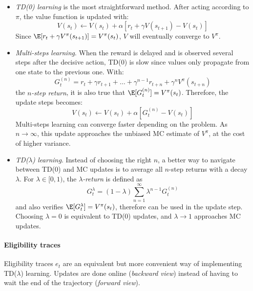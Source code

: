 \begin{itemize}
    \item \emph{TD(0) learning} is the most straightforward method. After acting according to $\pi$, the value function is updated with: 
    \[
        V(s_t) \leftarrow V(s_t) + \alpha [r_t + \gamma V(s_{t+1}) - V(s_t)]
    \]
    Since $\E[r_t + \gamma V^\pi(s_{t+1})] = V^\pi(s_t)$, $V$ will eventually converge to $V^\pi$. 
    
    \item \emph{Multi-steps learning}. When the reward is delayed and is observed several steps after the decisive action, TD(0) is slow since values only propagate from one state to the previous one. With:
    \[
        G_t^{(n)} = r_t + \gamma r_{t+1} + \dots + \gamma^{n-1} r_{t+n} + \gamma^n V^\pi(s_{t+n})
    \]
    the \emph{$n$-step return}, it is also true that $\E[G_t^{(n)}] = V^\pi(s_t)$. Therefore, the update steps becomes: 
    \[
        V(s_t) \leftarrow V(s_t) + \alpha [G_t^{(n)} - V(s_t)]
    \]
    Multi-steps learning can converge faster depending on the problem. As $n \rightarrow \infty$, this update approaches the unbiased MC estimate of $V^\pi$, at the cost of higher variance.

    \item \emph{TD($\lambda$) learning}. Instead of choosing the right $n$, a better way to navigate between TD(0) and MC updates is to average all $n$-step returns with a decay $\lambda$. For $\lambda \in [0,1)$, the \emph{$\lambda$-return} is defined as
    \[
        G_t^\lambda = (1-\lambda) \sum_{n=1}^\infty \lambda^{n-1} G_t^{(n)}
    \]
    and also verifies $\E[G_t^\lambda] = V^\pi(s_t)$, therefore can be used in the update step. Choosing $\lambda=0$ is equivalent to TD(0) updates, and $\lambda \rightarrow 1$ approaches MC updates.
\end{itemize}

\paragraph{Eligibility traces} Eligibility traces $e_t$ are an equivalent but more convenient way of implementing TD($\lambda$) learning. Updates are done online (\emph{backward view}) instead of having to wait the end of the trajectory (\emph{forward view}).

